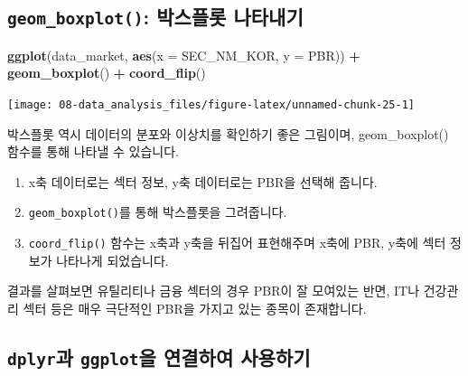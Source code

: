 \documentclass[12pt,]{book}
\newenvironment{Shaded}{\begin{snugshade}}{\end{snugshade}}
\newcommand{\DataTypeTok}[1]{\textcolor[rgb]{0.13,0.29,0.53}{#1}}
\newcommand{\KeywordTok}[1]{\textcolor[rgb]{0.13,0.29,0.53}{\textbf{#1}}}
\newcommand{\NormalTok}[1]{#1}
\newcommand{\OperatorTok}[1]{\textcolor[rgb]{0.81,0.36,0.00}{\textbf{#1}}}
\newcommand{\StringTok}[1]{\textcolor[rgb]{0.31,0.60,0.02}{#1}}
\providecommand{\tightlist}{%
  \setlength{\itemsep}{0pt}\setlength{\parskip}{0pt}}
\begin{document}
\hypertarget{geom_boxplot--}{%
\subsection{\texorpdfstring{\texttt{geom\_boxplot()}: 박스플롯 나타내기}{geom\_boxplot(): 박스플롯 나타내기}}\label{geom_boxplot--}}

\begin{Shaded}
\begin{Highlighting}[]
\KeywordTok{ggplot}\NormalTok{(data_market, }\KeywordTok{aes}\NormalTok{(}\DataTypeTok{x =}\NormalTok{ SEC_NM_KOR, }\DataTypeTok{y =}\NormalTok{ PBR)) }\OperatorTok{+}
\StringTok{  }\KeywordTok{geom_boxplot}\NormalTok{() }\OperatorTok{+}
\StringTok{  }\KeywordTok{coord_flip}\NormalTok{()}
\end{Highlighting}
\end{Shaded}

\begin{center}\texttt{[image: 08-data\_analysis\_files/figure-latex/unnamed-chunk-25-1]} \end{center}

박스플롯 역시 데이터의 분포와 이상치를 확인하기 좋은 그림이며, geom\_boxplot() 함수를
통해 나타낼 수 있습니다.

\begin{enumerate}
\def\labelenumi{\arabic{enumi}.}
\tightlist
\item
  x축 데이터로는 섹터 정보, y축 데이터로는 PBR을 선택해 줍니다.
\item
  \texttt{geom\_boxplot()}를 통해 박스플롯을 그려줍니다.
\item
  \texttt{coord\_flip()} 함수는 x축과 y축을 뒤집어 표현해주며 x축에 PBR, y축에 섹터 정보가 나타나게 되었습니다.
\end{enumerate}

결과를 살펴보면 유틸리티나 금융 섹터의 경우 PBR이 잘 모여있는 반면, IT나 건강관리 섹터 등은 매우 극단적인 PBR을 가지고 있는 종목이 존재합니다.

\hypertarget{dplyr-ggplot--}{%
\subsection{\texorpdfstring{\texttt{dplyr}과 \texttt{ggplot}을 연결하여 사용하기}{dplyr과 ggplot을 연결하여 사용하기}}\label{dplyr-ggplot--}}
\end{document}

